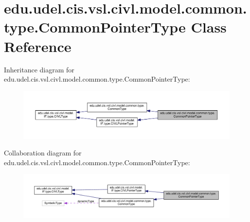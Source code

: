 \hypertarget{classedu_1_1udel_1_1cis_1_1vsl_1_1civl_1_1model_1_1common_1_1type_1_1CommonPointerType}{}\section{edu.\+udel.\+cis.\+vsl.\+civl.\+model.\+common.\+type.\+Common\+Pointer\+Type Class Reference}
\label{classedu_1_1udel_1_1cis_1_1vsl_1_1civl_1_1model_1_1common_1_1type_1_1CommonPointerType}


Inheritance diagram for edu.\+udel.\+cis.\+vsl.\+civl.\+model.\+common.\+type.\+Common\+Pointer\+Type\+:
\nopagebreak
\begin{figure}[H]
\begin{center}
\leavevmode
\includegraphics[width=350pt]{classedu_1_1udel_1_1cis_1_1vsl_1_1civl_1_1model_1_1common_1_1type_1_1CommonPointerType__inherit__graph}
\end{center}
\end{figure}


Collaboration diagram for edu.\+udel.\+cis.\+vsl.\+civl.\+model.\+common.\+type.\+Common\+Pointer\+Type\+:
\nopagebreak
\begin{figure}[H]
\begin{center}
\leavevmode
\includegraphics[width=350pt]{classedu_1_1udel_1_1cis_1_1vsl_1_1civl_1_1model_1_1common_1_1type_1_1CommonPointerType__coll__graph}
\end{center}
\end{figure}

